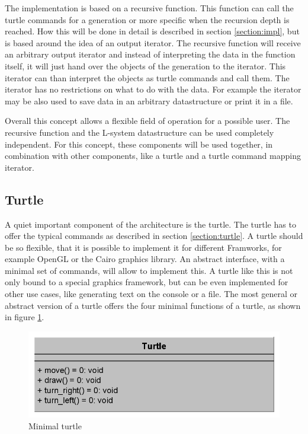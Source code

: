 \documentclass[english]{cpp-hmwk}
\begin{document}
The implementation is based on a recursive function. This function can call the turtle commands for a generation or more specific when the recursion depth is reached. How this will be done in detail is described in section \ref{section:impl}, but is based around the idea of an output iterator. The recursive function will receive an arbitrary output iterator and instead of interpreting the data in the function itself, it will just hand over the objects of the generation to the iterator. This iterator can than interpret the objects as turtle commands and call them. The iterator has no restrictions on what to do with the data. For example the iterator may be also used to save data in an arbitrary datastructure or print it in a file.

Overall this concept allows a flexible field of operation for a possible user. The recursive function and the L-system datastructure can be used completely independent. For this concept, these components will be used together, in combination with other components, like a turtle and a turtle command mapping iterator.

\subsection{Turtle}
A quiet important component of the architecture is the turtle. The turtle has to offer the typical commands as described in section \ref{section:turtle}. A turtle should be so flexible, that it is possible to implement it for different Framworks, for example OpenGL or the Cairo graphics library. An abstract interface, with a minimal set of commands, will allow to implement this. A turtle like this is not only bound to a special graphics framework, but can be even implemented for other use cases, like generating text on the console or a file.
The most general or abstract version of a turtle offers the four minimal functions of a turtle, as shown in figure \ref{figure:minimal_turtle}.

\begin{figure}[h!]
	\centering
	\includegraphics[width=0.6\columnwidth]{../graphs/class_simple_turtle.png}
	\caption{Minimal turtle}
	\label{figure:minimal_turtle}
\end{figure}
\end{document}

